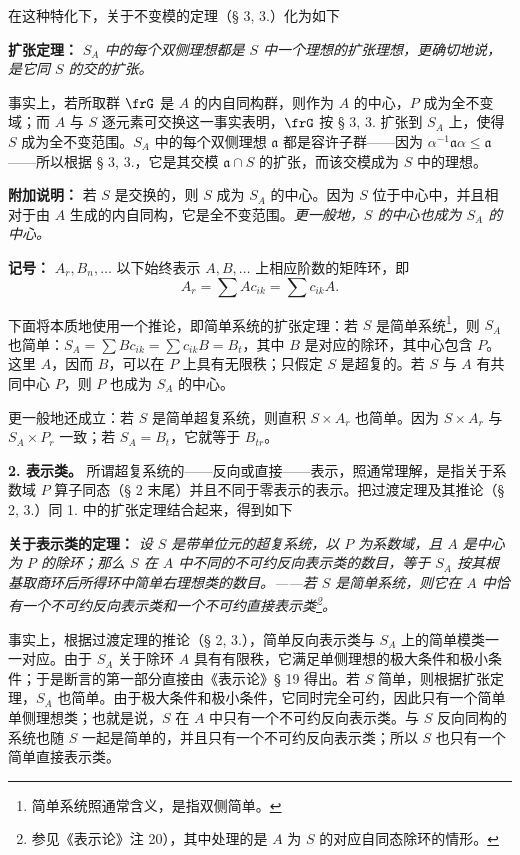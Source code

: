 在这种特化下，关于不变模的定理（§ 3, 3.）化为如下

\noindent\textbf{扩张定理：} \emph{\(S_A\) 中的每个双侧理想都是 \(S\) 中一个理想的扩张理想，更确切地说，是它同 \(S\) 的交的扩张。}

事实上，若所取群 \(\frG\) 是 \(A\) 的内自同构群，则作为 \(A\) 的中心，\(P\) 成为全不变域；而 \(A\) 与 \(S\) 逐元素可交换这一事实表明，\(\frG\) 按 § 3, 3. 扩张到 \(S_A\) 上，使得 \(S\) 成为全不变范围。\(S_A\) 中的每个双侧理想 \(\mathfrak a\) 都是容许子群——因为 \(\alpha^{-1}\mathfrak a\alpha\leq\mathfrak a\)——所以根据 § 3, 3.，它是其交模 \(\mathfrak a\cap S\) 的扩张，而该交模成为 \(S\) 中的理想。

\noindent\textbf{附加说明：} 若 \(S\) 是交换的，则 \(S\) 成为 \(S_A\) 的中心。因为 \(S\) 位于中心中，并且相对于由 \(A\) 生成的内自同构，它是全不变范围。\emph{更一般地，\(S\) 的中心也成为 \(S_A\) 的中心。}

\noindent\textbf{记号：} \(A_r,B_n,\ldots\) 以下始终表示 \(A,B,\ldots\) 上相应阶数的矩阵环，即
\[
        A_r=\sum A c_{ik}=\sum c_{ik}A.
\]

下面将本质地使用一个推论，即简单系统的扩张定理：若 \(S\) 是简单系统\footnote{简单系统照通常含义，是指\glqq{}双侧简单\grqq{}。}，则 \(S_A\) 也简单：\(S_A=\sum B c_{ik}=\sum c_{ik}B=B_t\)，其中 \(B\) 是对应的除环，其中心包含 \(P\)。这里 \(A\)，因而 \(B\)，可以在 \(P\) 上具有无限秩；只假定 \(S\) 是超复的。若 \(S\) 与 \(A\) 有共同中心 \(P\)，则 \(P\) 也成为 \(S_A\) 的中心。

更一般地还成立：若 \(S\) 是简单超复系统，则直积 \(S\times A_r\) 也简单。因为 \(S\times A_r\) 与 \(S_A\times P_r\) 一致；若 \(S_A=B_t\)，它就等于 \(B_{tr}\)。

\noindent\textbf{2. 表示类。} 所谓超复系统的——反向或直接——表示，照通常理解，是指关于系数域 \(P\) 算子同态（§ 2 末尾）并且不同于零表示的表示。把过渡定理及其推论（§ 2, 3.）同 1. 中的扩张定理结合起来，得到如下

\noindent\textbf{关于表示类的定理：} \emph{设 \(S\) 是带单位元的超复系统，以 \(P\) 为系数域，且 \(A\) 是中心为 \(P\) 的除环；那么 \(S\) 在 \(A\) 中不同的不可约反向表示类的数目，等于 \(S_A\) 按其根基取商环后所得环中简单右理想类的数目。——若 \(S\) 是简单系统，则它在 \(A\) 中恰有一个不可约反向表示类和一个不可约直接表示类\footnote{\normalfont 参见《表示论》注 20），其中处理的是 \(A\) 为 \(S\) 的对应自同态除环的情形。}。}

事实上，根据过渡定理的推论（§ 2, 3.），简单反向表示类与 \(S_A\) 上的简单模类一一对应。由于 \(S_A\) 关于除环 \(A\) 具有有限秩，它满足单侧理想的极大条件和极小条件；于是断言的第一部分直接由《表示论》§ 19 得出。若 \(S\) 简单，则根据扩张定理，\(S_A\) 也简单。由于极大条件和极小条件，它同时完全可约，因此只有一个简单单侧理想类；也就是说，\(S\) 在 \(A\) 中只有一个不可约反向表示类。与 \(S\) 反向同构的系统也随 \(S\) 一起是简单的，并且只有一个不可约反向表示类；所以 \(S\) 也只有一个简单直接表示类。

